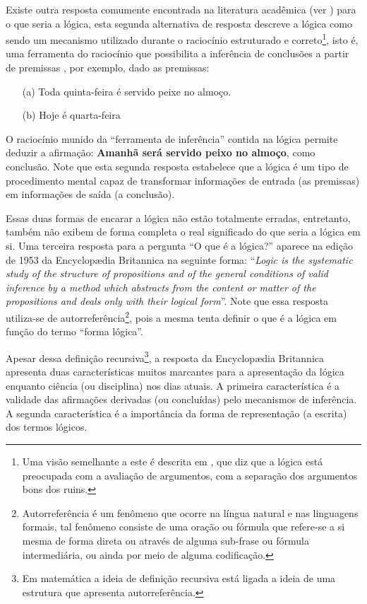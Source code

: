 Existe outra resposta comumente encontrada na literatura acadêmica (ver \cite{abe2002-logica, BenjaV1, joaoPavao2014}) para o que seria a lógica, esta segunda alternativa de resposta  descreve a lógica como sendo um mecanismo utilizado durante o raciocínio estruturado e correto\footnote{Uma visão semelhante a este é descrita em \cite{magnus2020}, que diz que a lógica está preocupada com a avaliação de argumentos, com a separação dos argumentos bons dos ruins.}, isto é, uma ferramenta do raciocínio que possibilita a inferência de conclusões a partir de premissas \cite{abe2002-logica, copi1981, hodges1997}, por exemplo, dado as premissas:

\begin{itemize}
	\item[(a)] Toda quinta-feira é servido peixe no almoço.
	\item[(b)] Hoje é quarta-feira
\end{itemize}

O raciocínio munido da ``ferramenta de inferência'' contida na lógica permite deduzir a afirmação: \textbf{Amanhã será servido peixo no almoço}, como conclusão. Note que esta segunda resposta estabelece que a lógica é um tipo de procedimento mental capaz de transformar informações de entrada (as premissas) em informações de saída (a conclusão). 

Essas duas formas de encarar a lógica não estão totalmente erradas, entretanto, também não exibem de forma completa o real significado do que seria a lógica em si. Uma terceira resposta para a pergunta ``O que é a lógica?'' aparece na edição de 1953 da Encyclopædia Britannica na seguinte forma: ``\textit{Logic is the systematic study of the structure of propositions and of the general conditions of valid inference by a method which abstracts from the content or matter of the propositions and deals only with their logical form}''. Note que essa resposta utiliza-se de autorreferência\footnote{Autorreferência é um fenômeno que ocorre na língua natural e nas linguagens formais, tal fenômeno consiste de uma oração ou fórmula que refere-se a si mesma de forma direta ou através de alguma sub-frase ou fórmula intermediária, ou ainda por meio de alguma codificação.}, pois a mesma tenta definir o que é a lógica em função do termo ``forma lógica''. 

Apesar dessa definição recursiva\footnote{Em matemática a ideia de definição recursiva está ligada a ideia de uma estrutura que apresenta autorreferência.}, a resposta da Encyclopædia Britannica apresenta duas características muitos marcantes para a apresentação da lógica enquanto ciência (ou disciplina) nos dias atuais. A primeira característica é a validade das afirmações derivadas (ou concluídas) pelo mecanismos de inferência. A segunda característica é a importância da forma de representação (a escrita) dos termos lógicos. 

